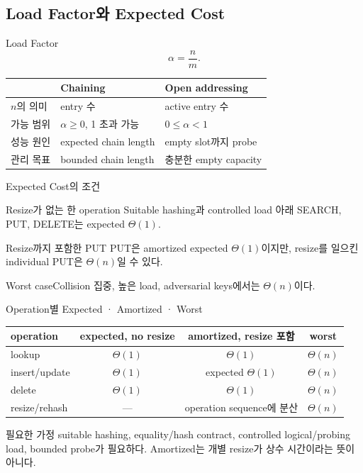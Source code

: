 \subsection{Load Factor와 Expected Cost}
\begin{frame}{Load Factor}
\[
\alpha=\frac{n}{m}.
\]
\small\centering\begin{tabular}{lll}\toprule
&Chaining&Open addressing\\\midrule
$n$의 의미&entry 수&active entry 수\\
가능 범위&$\alpha\ge0$, 1 초과 가능&$0\le\alpha<1$\\
성능 원인&expected chain length&empty slot까지 probe\\
관리 목표&bounded chain length&충분한 empty capacity\\\bottomrule
\end{tabular}
\end{frame}
\begin{frame}{Expected Cost의 조건}
\small
\begin{block}{Resize가 없는 한 operation}
Suitable hashing과 controlled load 아래 SEARCH, PUT, DELETE는 expected $\Theta(1)$.
\end{block}
\begin{block}{Resize까지 포함한 PUT}
PUT은 amortized expected $\Theta(1)$이지만, resize를 일으킨 individual PUT은 $\Theta(n)$일 수 있다.
\end{block}
\begin{alertblock}{Worst case}Collision 집중, 높은 load, adversarial keys에서는 $\Theta(n)$이다.\end{alertblock}
\end{frame}
\begin{frame}{Operation별 Expected · Amortized · Worst}
\small\centering
\begin{tabular}{lccc}\toprule
operation&expected, no resize&amortized, resize 포함&worst\\\midrule
lookup&$\Theta(1)$&$\Theta(1)$&$\Theta(n)$\\
insert/update&$\Theta(1)$&expected $\Theta(1)$&$\Theta(n)$\\
delete&$\Theta(1)$&$\Theta(1)$&$\Theta(n)$\\
resize/rehash&---&operation sequence에 분산&$\Theta(n)$\\\bottomrule
\end{tabular}
\begin{alertblock}{필요한 가정}
suitable hashing, equality/hash contract, controlled logical/probing load,
bounded probe가 필요하다. Amortized는 개별 resize가 상수 시간이라는 뜻이 아니다.
\end{alertblock}
\end{frame}
